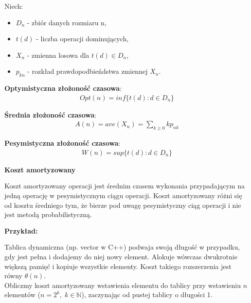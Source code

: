 \documentclass[12pt]{article}
\begin{document}
    \begin{definition}
        Niech:
        \begin{itemize}
            \item $D_n$ - zbiór danych rozmiaru n,
            \item $t(d)$ - liczba operacji dominujących,
            \item $X_n$ - zmienna losowa dla $t(d) \in D_n$,
            \item $p_{kn}$ - rozkład prawdopodbieńdstwa zmiennej $X_n$.
        \end{itemize}

        \textbf{Optymistyczna złożoność czasowa}:
        \begin{align*}
            Opt(n) = inf\{t(d) : d \in D_n\}
        \end{align*}

        \textbf{Średnia złożoność czasowa}:
        \begin{align*}
            A(n) = ave(X_n) = \sum_{k \geq 0}kp_{nk}
        \end{align*}

        \textbf{Pesymistyczna złożoność czasowa}:
        \begin{align*}
            W(n) = sup\{t(d) : d \in D_n\}
        \end{align*}
    \end{definition}

    \begin{definition}
        \textbf{Koszt amortyzowany}
        
        Koszt amortyzowany operacji jest średnim czasem wykonania przypadającym na jedną operację w pesymistycznym ciągu operacji. Koszt amortyzowany różni się od kosztu średniego tym, że bierze pod uwagę pesymistyczny ciąg operacji i nie jest metodą probabilistyczną.
        
    \end{definition}
    
    \textbf{Przykład:}
    
    Tablica dynamiczna (np. vector w C++) podwaja swoją długość w przypadku, gdy jest pełna i dodajemy do niej nowy element.
    Alokuje wówczas dwukrotnie większą pamięć i kopiuje wszystkie elementy. 
    Koszt takiego rozszerzenia jest równy $\theta(n)$.\\
    
    Obliczmy koszt amortyzowany wstawienia elementu do tablicy przy wstawieniu $n$ elementów ($n = 2^k,\; k \in \mathbb{N}$),
    zaczynając od pustej tablicy o długości 1.
    
\end{document}
